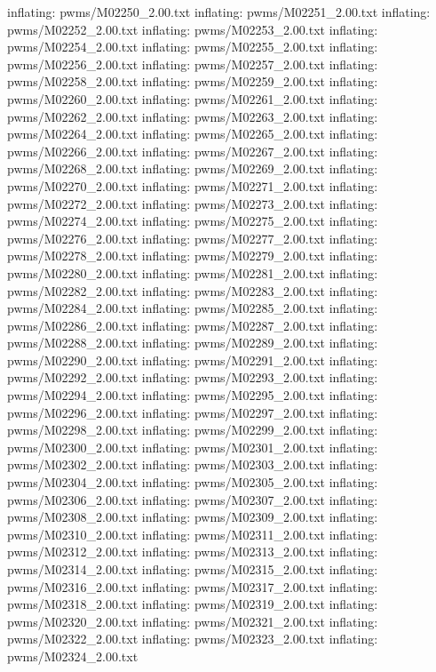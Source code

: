 \documentclass[letterpaper,10pt,english]{sphinxmanual}
\begin{document}
{\begin{sphinxVerbatim}[commandchars=\\\{\}]
  inflating: pwms/M02250\_2.00.txt
  inflating: pwms/M02251\_2.00.txt
  inflating: pwms/M02252\_2.00.txt
  inflating: pwms/M02253\_2.00.txt
  inflating: pwms/M02254\_2.00.txt
  inflating: pwms/M02255\_2.00.txt
  inflating: pwms/M02256\_2.00.txt
  inflating: pwms/M02257\_2.00.txt
  inflating: pwms/M02258\_2.00.txt
  inflating: pwms/M02259\_2.00.txt
  inflating: pwms/M02260\_2.00.txt
  inflating: pwms/M02261\_2.00.txt
  inflating: pwms/M02262\_2.00.txt
  inflating: pwms/M02263\_2.00.txt
  inflating: pwms/M02264\_2.00.txt
  inflating: pwms/M02265\_2.00.txt
  inflating: pwms/M02266\_2.00.txt
  inflating: pwms/M02267\_2.00.txt
  inflating: pwms/M02268\_2.00.txt
  inflating: pwms/M02269\_2.00.txt
  inflating: pwms/M02270\_2.00.txt
  inflating: pwms/M02271\_2.00.txt
  inflating: pwms/M02272\_2.00.txt
  inflating: pwms/M02273\_2.00.txt
  inflating: pwms/M02274\_2.00.txt
  inflating: pwms/M02275\_2.00.txt
  inflating: pwms/M02276\_2.00.txt
  inflating: pwms/M02277\_2.00.txt
  inflating: pwms/M02278\_2.00.txt
  inflating: pwms/M02279\_2.00.txt
  inflating: pwms/M02280\_2.00.txt
  inflating: pwms/M02281\_2.00.txt
  inflating: pwms/M02282\_2.00.txt
  inflating: pwms/M02283\_2.00.txt
  inflating: pwms/M02284\_2.00.txt
  inflating: pwms/M02285\_2.00.txt
  inflating: pwms/M02286\_2.00.txt
  inflating: pwms/M02287\_2.00.txt
  inflating: pwms/M02288\_2.00.txt
  inflating: pwms/M02289\_2.00.txt
  inflating: pwms/M02290\_2.00.txt
  inflating: pwms/M02291\_2.00.txt
  inflating: pwms/M02292\_2.00.txt
  inflating: pwms/M02293\_2.00.txt
  inflating: pwms/M02294\_2.00.txt
  inflating: pwms/M02295\_2.00.txt
  inflating: pwms/M02296\_2.00.txt
  inflating: pwms/M02297\_2.00.txt
  inflating: pwms/M02298\_2.00.txt
  inflating: pwms/M02299\_2.00.txt
  inflating: pwms/M02300\_2.00.txt
  inflating: pwms/M02301\_2.00.txt
  inflating: pwms/M02302\_2.00.txt
  inflating: pwms/M02303\_2.00.txt
  inflating: pwms/M02304\_2.00.txt
  inflating: pwms/M02305\_2.00.txt
  inflating: pwms/M02306\_2.00.txt
  inflating: pwms/M02307\_2.00.txt
  inflating: pwms/M02308\_2.00.txt
  inflating: pwms/M02309\_2.00.txt
  inflating: pwms/M02310\_2.00.txt
  inflating: pwms/M02311\_2.00.txt
  inflating: pwms/M02312\_2.00.txt
  inflating: pwms/M02313\_2.00.txt
  inflating: pwms/M02314\_2.00.txt
  inflating: pwms/M02315\_2.00.txt
  inflating: pwms/M02316\_2.00.txt
  inflating: pwms/M02317\_2.00.txt
  inflating: pwms/M02318\_2.00.txt
  inflating: pwms/M02319\_2.00.txt
  inflating: pwms/M02320\_2.00.txt
  inflating: pwms/M02321\_2.00.txt
  inflating: pwms/M02322\_2.00.txt
  inflating: pwms/M02323\_2.00.txt
  inflating: pwms/M02324\_2.00.txt

\end{sphinxVerbatim}}
\end{document}
